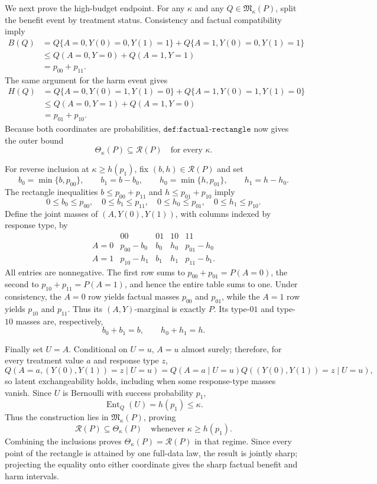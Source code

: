We next prove the high-budget endpoint.  For any \(\kappa\) and any \(Q\in\mathfrak M_\kappa(P)\), split the benefit event by treatment status.  Consistency and factual compatibility imply
\[
\begin{aligned}
B(Q)
&=Q\{A=0,Y(0)=0,Y(1)=1\}+Q\{A=1,Y(0)=0,Y(1)=1\}\\
&\leq Q(A=0,Y=0)+Q(A=1,Y=1)\\
&=p_{00}+p_{11}.
\end{aligned}
\]
The same argument for the harm event gives
\[
\begin{aligned}
H(Q)
&=Q\{A=0,Y(0)=1,Y(1)=0\}+Q\{A=1,Y(0)=1,Y(1)=0\}\\
&\leq Q(A=0,Y=1)+Q(A=1,Y=0)\\
&=p_{01}+p_{10}.
\end{aligned}
\]
Because both coordinates are probabilities, \(\texttt{def:factual-rectangle}\) now gives the outer bound
\[
\Theta_\kappa(P)\subseteq\mathcal R(P)
\quad\text{for every }\kappa.
\]

For reverse inclusion at \(\kappa\geq h(p_1)\), fix \((b,h)\in\mathcal R(P)\) and set
\[
b_0=\min\{b,p_{00}\},\qquad b_1=b-b_0,
\qquad
h_0=\min\{h,p_{01}\},\qquad h_1=h-h_0.
\]
The rectangle inequalities \(b\leq p_{00}+p_{11}\) and \(h\leq p_{01}+p_{10}\) imply
\[
0\leq b_0\leq p_{00},\quad 0\leq b_1\leq p_{11},\quad
0\leq h_0\leq p_{01},\quad 0\leq h_1\leq p_{10}.
\]
Define the joint masses of \((A,Y(0),Y(1))\), with columns indexed by response type, by
\[
\begin{array}{c|cccc}
 &00&01&10&11\\ \hline
A=0&p_{00}-b_0&b_0&h_0&p_{01}-h_0\\
A=1&p_{10}-h_1&b_1&h_1&p_{11}-b_1.
\end{array}
\]
All entries are nonnegative.  The first row sums to \(p_{00}+p_{01}=P(A=0)\), the second to \(p_{10}+p_{11}=P(A=1)\), and hence the entire table sums to one.  Under consistency, the \(A=0\) row yields factual masses \(p_{00}\) and \(p_{01}\), while the \(A=1\) row yields \(p_{10}\) and \(p_{11}\).  Thus its \((A,Y)\)-marginal is exactly \(P\).  Its type-\(01\) and type-\(10\) masses are, respectively,
\[
b_0+b_1=b,\qquad h_0+h_1=h.
\]

Finally set \(U=A\).  Conditional on \(U=u\), \(A=u\) almost surely; therefore, for every treatment value \(a\) and response type \(z\),
\[
Q(A=a,(Y(0),Y(1))=z\mid U=u)
=Q(A=a\mid U=u)Q((Y(0),Y(1))=z\mid U=u),
\]
so latent exchangeability holds, including when some response-type masses vanish.  Since \(U\) is Bernoulli with success probability \(p_1\),
\[
\operatorname{Ent}_Q(U)=h(p_1)\leq\kappa.
\]
Thus the construction lies in \(\mathfrak M_\kappa(P)\), proving
\[
\mathcal R(P)\subseteq\Theta_\kappa(P)
\quad\text{whenever }\kappa\geq h(p_1).
\]
Combining the inclusions proves \(\Theta_\kappa(P)=\mathcal R(P)\) in that regime.  Since every point of the rectangle is attained by one full-data law, the result is jointly sharp; projecting the equality onto either coordinate gives the sharp factual benefit and harm intervals.